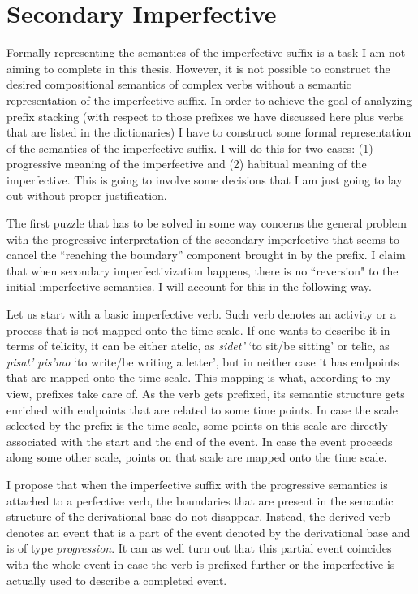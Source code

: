 \section{Secondary Imperfective}\label{section:imperfective}
Formally representing the semantics of the imperfective suffix is a task I am not aiming to complete in this thesis. However, it is not possible to construct the desired compositional semantics of complex verbs without a semantic representation of the imperfective suffix. In order to achieve the goal of analyzing prefix stacking (with respect to those prefixes we have discussed here plus verbs that are listed in the dictionaries) I have to construct some formal representation of the semantics of the imperfective suffix. I will do this for two cases: (1) progressive meaning of the imperfective and (2) habitual meaning of the imperfective. This is going to involve some decisions that I am just going to lay out without proper justification.

The first puzzle that has to be solved in some way concerns the general problem with the progressive interpretation of the secondary imperfective that seems to cancel the ``reaching the boundary'' component brought in by the prefix. I claim that when secondary imperfectivization happens, there is no ``reversion" to the initial imperfective semantics. I will account for this in the following way. 

Let us start with a basic imperfective verb. Such verb denotes an activity or a process that is not mapped onto the time scale. If one wants to describe it in terms of telicity, it can be either atelic, as \textit{sidet'} `to sit/be sitting' or telic, as \textit{pisat' pis'mo} `to write/be writing a letter', but in neither case it has endpoints that are mapped onto the time scale. This mapping is what, according to my view, prefixes take care of. As the verb gets prefixed, its semantic structure gets enriched with endpoints that are related to some time points. In case the scale selected by the prefix is the time scale, some points on this scale are directly associated with the start and the end of the event. In case the event proceeds along some other scale, points on that scale are mapped onto the time scale. 

I propose that when the imperfective suffix with the progressive semantics is attached to a perfective verb, the boundaries that are present in the semantic structure of the derivational base do not disappear. Instead, the derived verb denotes an event that is a part of the event denoted by the derivational base and is of type \textit{progression}. It can as well turn out that this partial event coincides with the whole event in case the verb is prefixed further or the imperfective is actually used to describe a completed event.

